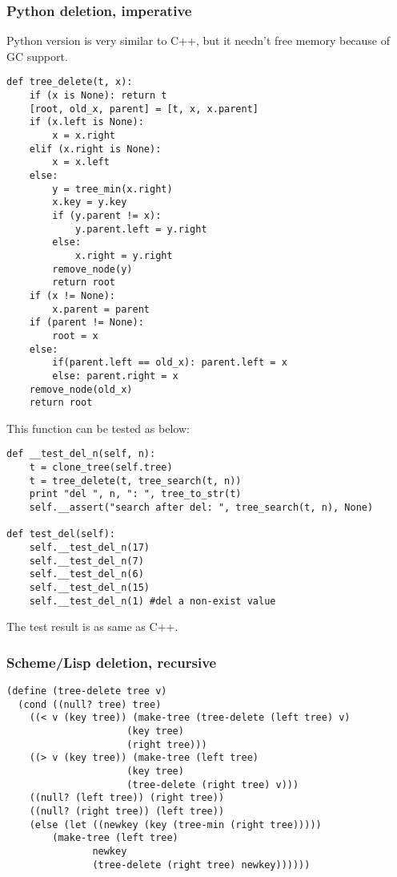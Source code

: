 \documentclass{article}
\begin{document}
\subsubsection*{Python deletion, imperative}
Python version is very similar to C++, but it needn't free memory because
of GC support.

\lstset{language=Python}
\begin{lstlisting}
def tree_delete(t, x):
    if (x is None): return t
    [root, old_x, parent] = [t, x, x.parent]
    if (x.left is None):
        x = x.right
    elif (x.right is None):
        x = x.left
    else:
        y = tree_min(x.right)
        x.key = y.key
        if (y.parent != x):
            y.parent.left = y.right
        else:
            x.right = y.right
        remove_node(y)
        return root
    if (x != None):
        x.parent = parent
    if (parent != None):
        root = x
    else:
        if(parent.left == old_x): parent.left = x
        else: parent.right = x
    remove_node(old_x)
    return root
\end{lstlisting}

This function can be tested as below:

\begin{lstlisting}
def __test_del_n(self, n):
    t = clone_tree(self.tree)
    t = tree_delete(t, tree_search(t, n))
    print "del ", n, ": ", tree_to_str(t)
    self.__assert("search after del: ", tree_search(t, n), None)

def test_del(self):
    self.__test_del_n(17)
    self.__test_del_n(7)
    self.__test_del_n(6)
    self.__test_del_n(15)
    self.__test_del_n(1) #del a non-exist value
\end{lstlisting}

The test result is as same as C++.

\subsubsection*{Scheme/Lisp deletion, recursive}

\lstset{language=lisp}
\begin{lstlisting}
(define (tree-delete tree v)
  (cond ((null? tree) tree)
	((< v (key tree)) (make-tree (tree-delete (left tree) v)
				     (key tree)
				     (right tree)))
	((> v (key tree)) (make-tree (left tree)
				     (key tree)
				     (tree-delete (right tree) v)))
	((null? (left tree)) (right tree))
	((null? (right tree)) (left tree))
	(else (let ((newkey (key (tree-min (right tree)))))
		(make-tree (left tree)
			   newkey
			   (tree-delete (right tree) newkey))))))
\end{lstlisting}
\end{document}

